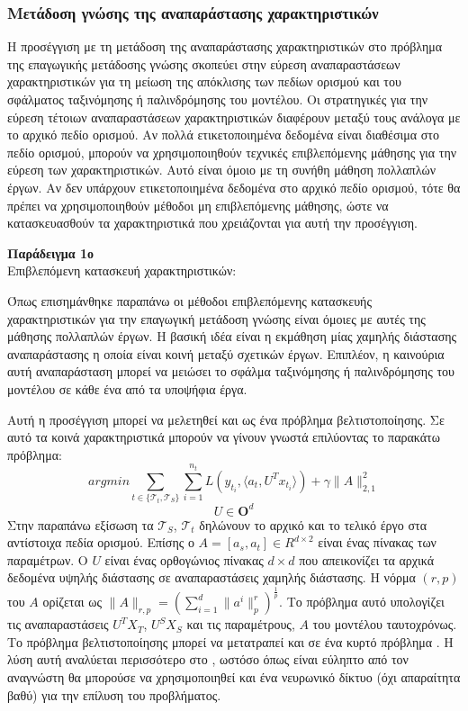 \subsubsection{Μετάδοση γνώσης της αναπαράστασης χαρακτηριστικών}
Η προσέγγιση με τη μετάδοση της αναπαράστασης χαρακτηριστικών στο πρόβλημα της επαγωγικής μετάδοσης γνώσης σκοπεύει στην εύρεση αναπαραστάσεων χαρακτηριστικών για τη μείωση της απόκλισης των πεδίων ορισμού και του σφάλματος ταξινόμησης ή παλινδρόμησης του μοντέλου. Οι στρατηγικές για την εύρεση τέτοιων αναπαραστάσεων χαρακτηριστικών διαφέρουν μεταξύ τους ανάλογα με το αρχικό πεδίο ορισμού. Αν πολλά ετικετοποιημένα δεδομένα είναι διαθέσιμα στο πεδίο ορισμού, μπορούν να χρησιμοποιηθούν τεχνικές επιβλεπόμενης μάθησης για την εύρεση των χαρακτηριστικών. Αυτό είναι όμοιο με τη συνήθη μάθηση πολλαπλών έργων. Αν δεν υπάρχουν ετικετοποιημένα δεδομένα στο αρχικό πεδίο ορισμού, τότε θα πρέπει να χρησιμοποιηθούν μέθοδοι μη επιβλεπόμενης μάθησης, ώστε να κατασκευασθούν τα χαρακτηριστικά που χρειάζονται για αυτή την προσέγγιση.
\vspace{1em}

\textbf{Παράδειγμα 1ο}\\
Επιβλεπόμενη κατασκευή χαρακτηριστικών:

Όπως επισημάνθηκε παραπάνω οι μέθοδοι επιβλεπόμενης κατασκευής χαρακτηριστικών για την επαγωγική μετάδοση γνώσης είναι όμοιες με αυτές της μάθησης πολλαπλών έργων. Η βασική ιδέα είναι η εκμάθηση μίας χαμηλής διάστασης αναπαράστασης η οποία είναι κοινή μεταξύ σχετικών έργων. Επιπλέον, η καινούρια αυτή αναπαράσταση μπορεί να μειώσει το σφάλμα ταξινόμησης ή παλινδρόμησης του μοντέλου σε κάθε ένα από τα υποψήφια έργα.

Αυτή η προσέγγιση μπορεί να μελετηθεί και ως ένα πρόβλημα βελτιστοποίησης. Σε αυτό τα κοινά χαρακτηριστικά μπορούν να γίνουν γνωστά επιλύοντας το παρακάτω πρόβλημα:
$$
argmin \sum_{t \in \{\mathcal{T}_t, \mathcal{T}_S\} } {\sum_{i=1}^{n_t}} {L\left(y_{t_i}, \langle a_t, U^T x_{t_i} \rangle  \right) + \gamma \|A\|^{2}_{2,1} } 
$$
$$
U \in \mathbf{O}^d
$$
Στην παραπάνω εξίσωση  τα $\mathcal{T}_S$, $\mathcal{T}_t$ δηλώνουν το αρχικό και το τελικό έργο στα αντίστοιχα πεδία ορισμού. Επίσης ο $A = [a_s,a_t] \in R^{d\times2}$ είναι ένας πίνακας των παραμέτρων. Ο $U$ είναι ένας ορθογώνιος πίνακας $d \times d$ που απεικονίζει τα αρχικά δεδομένα υψηλής διάστασης σε αναπαραστάσεις χαμηλής διάστασης. Η νόρμα $(r, p)$ του $A$ ορίζεται ως $ \|A\|_{r,p} = \left( \sum_{i=1}^{d}{\| a^i\|_{p}^{r}} \right)^{\frac{1}{p}}$. Το πρόβλημα αυτό υπολογίζει τις αναπαραστάσεις $U^T X_T$, $U^S X_S$ και τις παραμέτρους, $A$ του μοντέλου ταυτοχρόνως. Το πρόβλημα βελτιστοποίησης μπορεί να μετατραπεί και σε ένα κυρτό πρόβλημα \cite{47}. Η λύση αυτή αναλύεται περισσότερο στο \cite{46}, ωστόσο όπως είναι εύληπτο από τον αναγνώστη θα μπορούσε να χρησιμοποιηθεί και ένα νευρωνικό δίκτυο (όχι απαραίτητα βαθύ) για την επίλυση του προβλήματος.
\vspace{1em}

